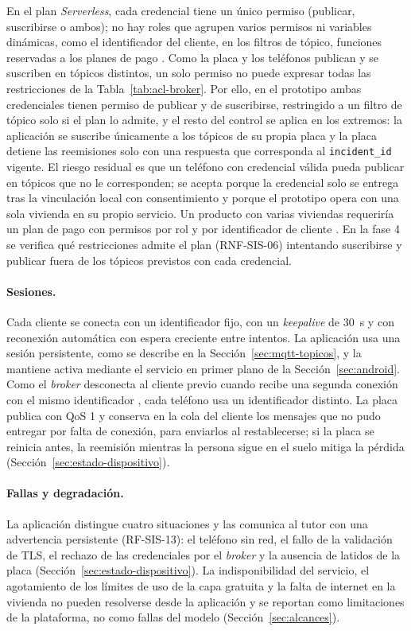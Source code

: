 \documentclass[12pt,a4paper,oneside]{book}
\theoremstyle{plain}
\theoremstyle{definition}
\theoremstyle{remark}
\begin{document}
En el plan \textit{Serverless}, cada credencial tiene un único permiso (publicar, suscribirse o ambos); no hay roles que agrupen varios permisos ni variables dinámicas, como el identificador del cliente, en los filtros de tópico, funciones reservadas a los planes de pago \parencite{hivemq2026acceso}. Como la placa y los teléfonos publican y se suscriben en tópicos distintos, un solo permiso no puede expresar todas las restricciones de la Tabla~\ref{tab:acl-broker}. Por ello, en el prototipo ambas credenciales tienen permiso de publicar y de suscribirse, restringido a un filtro de tópico solo si el plan lo admite, y el resto del control se aplica en los extremos: la aplicación se suscribe únicamente a los tópicos de su propia placa y la placa detiene las reemisiones solo con una respuesta que corresponda al \texttt{incident\_id} vigente. El riesgo residual es que un teléfono con credencial válida pueda publicar en tópicos que no le corresponden; se acepta porque la credencial solo se entrega tras la vinculación local con consentimiento y porque el prototipo opera con una sola vivienda en su propio servicio. Un producto con varias viviendas requeriría un plan de pago con permisos por rol y por identificador de cliente \parencite{hivemq2026acceso}. En la fase 4 se verifica qué restricciones admite el plan (RNF-SIS-06) intentando suscribirse y publicar fuera de los tópicos previstos con cada credencial.

\paragraph{Sesiones.} Cada cliente se conecta con un identificador fijo, con un \textit{keepalive} de 30~s y con reconexión automática con espera creciente entre intentos. La aplicación usa una sesión persistente, como se describe en la Sección~\ref{sec:mqtt-topicos}, y la mantiene activa mediante el servicio en primer plano de la Sección~\ref{sec:android}. Como el \textit{broker} desconecta al cliente previo cuando recibe una segunda conexión con el mismo identificador \parencite{oasis2014mqtt311}, cada teléfono usa un identificador distinto. La placa publica con QoS 1 y conserva en la cola del cliente los mensajes que no pudo entregar por falta de conexión, para enviarlos al restablecerse; si la placa se reinicia antes, la reemisión mientras la persona sigue en el suelo mitiga la pérdida (Sección~\ref{sec:estado-dispositivo}).

\paragraph{Fallas y degradación.} La aplicación distingue cuatro situaciones y las comunica al tutor con una advertencia persistente (RF-SIS-13): el teléfono sin red, el fallo de la validación de TLS, el rechazo de las credenciales por el \textit{broker} y la ausencia de latidos de la placa (Sección~\ref{sec:estado-dispositivo}). La indisponibilidad del servicio, el agotamiento de los límites de uso de la capa gratuita y la falta de internet en la vivienda no pueden resolverse desde la aplicación y se reportan como limitaciones de la plataforma, no como fallas del modelo (Sección~\ref{sec:alcances}).
\end{document}
